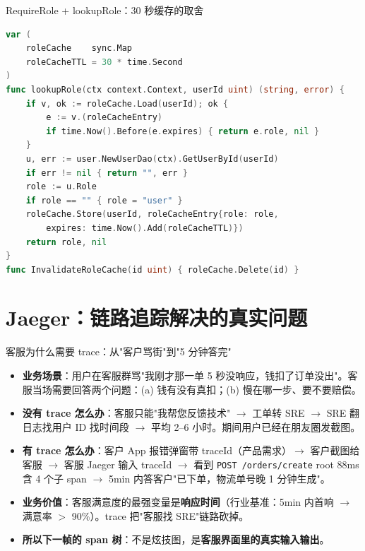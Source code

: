 \documentclass[aspectratio=169,11pt]{beamer}
\begin{document}
\begin{frame}{RequireRole + lookupRole：30 秒缓存的取舍}
\begin{lstlisting}[language=Go,firstnumber=22,
  caption={}]
var (
    roleCache    sync.Map
    roleCacheTTL = 30 * time.Second
)
func lookupRole(ctx context.Context, userId uint) (string, error) {
    if v, ok := roleCache.Load(userId); ok {
        e := v.(roleCacheEntry)
        if time.Now().Before(e.expires) { return e.role, nil }
    }
    u, err := user.NewUserDao(ctx).GetUserById(userId)
    if err != nil { return "", err }
    role := u.Role
    if role == "" { role = "user" }
    roleCache.Store(userId, roleCacheEntry{role: role,
        expires: time.Now().Add(roleCacheTTL)})
    return role, nil
}
func InvalidateRoleCache(id uint) { roleCache.Delete(id) }
\end{lstlisting}
\end{frame}

\section{Jaeger：链路追踪解决的真实问题}

\begin{frame}[shrink]{客服为什么需要 trace：从"客户骂街"到"5 分钟答完"}
\begin{itemize}
  \item \textbf{业务场景}：用户在客服群骂"我刚才那一单 5 秒没响应，钱扣了订单没出"。客服当场需要回答两个问题：(a) 钱有没有真扣；(b) 慢在哪一步、要不要赔偿。
  \item \textbf{没有 trace 怎么办}：客服只能"我帮您反馈技术" $\to$ 工单转 SRE $\to$ SRE 翻日志找用户 ID 找时间段 $\to$ 平均 2--6 小时。期间用户已经在朋友圈发截图。
  \item \textbf{有 trace 怎么办}：客户 App 报错弹窗带 traceId（产品需求）$\to$ 客户截图给客服 $\to$ 客服 Jaeger 输入 traceId $\to$ 看到 \texttt{POST /orders/create} root 88ms 含 4 个子 span $\to$ 5min 内答客户"已下单，物流单号晚 1 分钟生成"。
  \item \textbf{业务价值}：客服满意度的最强变量是\textbf{响应时间}（行业基准：5min 内首响 $\to$ 满意率 $>$ 90\%）。trace 把"客服找 SRE"链路砍掉。
  \item \textbf{所以下一帧的 span 树}：不是炫技图，是\textbf{客服界面里的真实输入输出}。
\end{itemize}
\end{frame}
\end{document}
